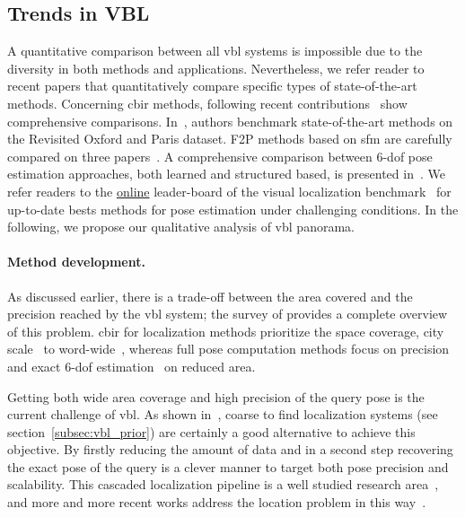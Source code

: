 	\subsection{Trends in VBL}
		\label{subsec:qualitative_comparison}
    	
		A quantitative comparison between all \ac{vbl} systems is impossible due to the diversity in both methods and applications. Nevertheless, we refer reader to recent papers that quantitatively compare specific types of state-of-the-art methods. Concerning \ac{cbir} methods, following recent contributions~\citep{Radenovic2016,Gordo2016} show comprehensive comparisons. In~\citep{Radenovic2018}, authors benchmark state-of-the-art methods on the Revisited Oxford and Paris dataset. F2P methods based on \ac{sfm} are carefully compared on three papers~\citep{Feng2016a,Sattler2016a,Svarm2016}. A comprehensive comparison between 6-\ac{dof} pose estimation approaches, both learned and structured based, is presented in~\citep{Sattler2019}. We refer readers to the \href{https://www.visuallocalization.net/benchmark/}{online} leader-board of the visual localization benchmark~\citep{Sattler2018} for up-to-date bests methods for pose estimation under challenging conditions. In the following, we propose our qualitative analysis of \ac{vbl} panorama. 
        
        \paragraph{Method development.}
        	As discussed earlier, there is a trade-off between the area covered and the precision reached by the \ac{vbl} system; the survey of \citet{Brejcha2017} provides a complete overview of this problem. \ac{cbir} for localization methods prioritize the space coverage, city scale~\citep{Gordo2016} to word-wide~\citep{Vo2017}, whereas full pose computation methods focus on precision and exact 6-\ac{dof} estimation~\citep{Feng2016a} on reduced area. 

	        Getting both wide area coverage and high precision of the query pose is the current challenge of \ac{vbl}. As shown in~\citep{Sattler2017}, coarse to find localization systems (see section~\ref{subsec:vbl_prior}) are certainly a good alternative to achieve this objective. By firstly reducing the amount of data and in a second step recovering the exact pose of the query is a clever manner to target both pose precision and scalability. This cascaded localization pipeline is a well studied research area~\citep{Rubio2015,Azzi2016,Song2016,Meng2016,Sattler2017}, and more and more recent works address the location problem in this way~\citep{Sarlin2018a,Sarlin2018,Germain2019,Taira2018,Taira2019}.
     
